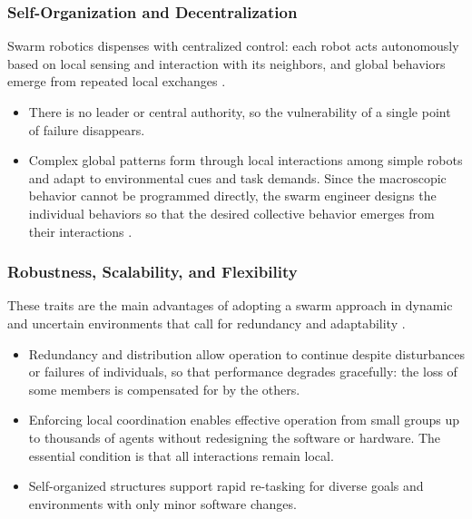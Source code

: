 \subsubsection{Self-Organization and Decentralization}

Swarm robotics dispenses with centralized control: each robot acts autonomously
based on local sensing and interaction with its neighbors, and global behaviors
emerge from repeated local exchanges \cite{dias2021swarm}.
\begin{itemize}
  \item {} There is no leader or central authority, so
        the vulnerability of a single point of failure disappears.
  \item {} Complex global patterns form through local
        interactions among simple robots and adapt to environmental cues and
        task demands. Since the macroscopic behavior cannot be programmed
        directly, the swarm engineer designs the individual behaviors so that the
        desired collective behavior emerges from their interactions
        \cite{brambilla2013swarm}.
\end{itemize}

\subsubsection{Robustness, Scalability, and Flexibility}

These traits are the main advantages of adopting a swarm approach in dynamic and
uncertain environments that call for redundancy and adaptability
\cite{lin2022review,tan2013research}.
\begin{itemize}
  \item {} Redundancy and distribution allow operation to continue
        despite disturbances or failures of individuals, so that performance
        degrades gracefully: the loss of some members is compensated for by the
        others.
  \item {} Enforcing local coordination enables effective
        operation from small groups up to thousands of agents without redesigning
        the software or hardware. The essential condition is that all
        interactions remain local.
  \item {} Self-organized structures support rapid re-tasking
        for diverse goals and environments with only minor software changes.
\end{itemize}

